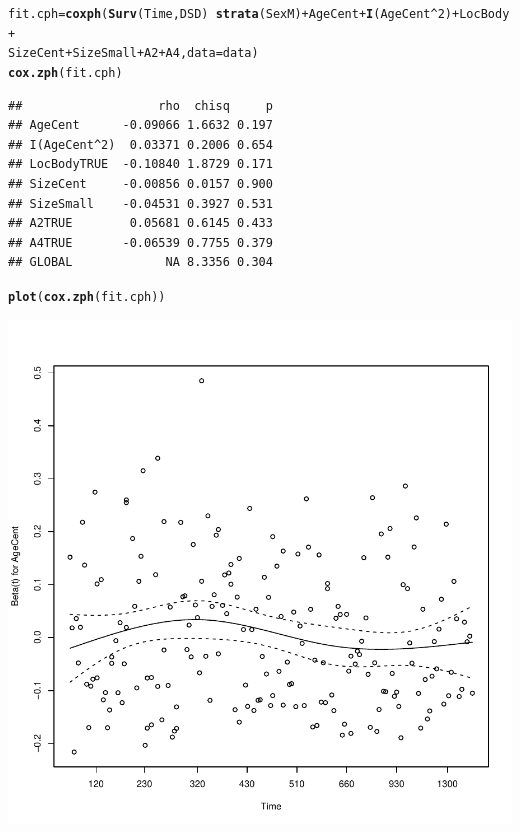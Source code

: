 \documentclass{article}\usepackage[]{graphicx}\usepackage[]{color}
\makeatletter
\def\maxwidth{ %
  \ifdim\Gin@nat@width>\linewidth
    \linewidth
  \else
    \Gin@nat@width
  \fi
}
\newcommand{\hlnum}[1]{\textcolor[rgb]{0.686,0.059,0.569}{#1}}%
\newcommand{\hlopt}[1]{\textcolor[rgb]{0,0,0}{#1}}%
\newcommand{\hlstd}[1]{\textcolor[rgb]{0.345,0.345,0.345}{#1}}%
\newcommand{\hlkwb}[1]{\textcolor[rgb]{0.69,0.353,0.396}{#1}}%
\newcommand{\hlkwc}[1]{\textcolor[rgb]{0.333,0.667,0.333}{#1}}%
\newcommand{\hlkwd}[1]{\textcolor[rgb]{0.737,0.353,0.396}{\textbf{#1}}}%
\newenvironment{kframe}{%
 \def\at@end@of@kframe{}%
 \ifinner\ifhmode%
  \def\at@end@of@kframe{\end{minipage}}%
  \begin{minipage}{\columnwidth}%
 \fi\fi%
 \def\FrameCommand##1{\hskip\@totalleftmargin \hskip-\fboxsep
 \colorbox{shadecolor}{##1}\hskip-\fboxsep
     \hskip-\linewidth \hskip-\@totalleftmargin \hskip\columnwidth}%
 \MakeFramed {\advance\hsize-\width
   \@totalleftmargin\z@ \linewidth\hsize
   \@setminipage}}%
 {\par\unskip\endMakeFramed%
 \at@end@of@kframe}
\newenvironment{knitrout}{}{} %
\makeatother
\begin{document}
\begin{knitrout}
\color{fgcolor}\begin{kframe}
\begin{alltt}
\hlstd{fit.cph} \hlkwb{=} \hlkwd{coxph}\hlstd{(}\hlkwd{Surv}\hlstd{(Time, DSD)} \hlopt{~} \hlkwd{strata}\hlstd{(SexM)} \hlopt{+} \hlstd{AgeCent} \hlopt{+} \hlkwd{I}\hlstd{(AgeCent}\hlopt{^}\hlnum{2}\hlstd{)} \hlopt{+} \hlstd{LocBody} \hlopt{+}
    \hlstd{SizeCent} \hlopt{+} \hlstd{SizeSmall} \hlopt{+} \hlstd{A2} \hlopt{+} \hlstd{A4,} \hlkwc{data} \hlstd{= data)}
\hlkwd{cox.zph}\hlstd{(fit.cph)}
\end{alltt}
\begin{verbatim}
##                   rho  chisq     p
## AgeCent      -0.09066 1.6632 0.197
## I(AgeCent^2)  0.03371 0.2006 0.654
## LocBodyTRUE  -0.10840 1.8729 0.171
## SizeCent     -0.00856 0.0157 0.900
## SizeSmall    -0.04531 0.3927 0.531
## A2TRUE        0.05681 0.6145 0.433
## A4TRUE       -0.06539 0.7755 0.379
## GLOBAL             NA 8.3356 0.304
\end{verbatim}
\begin{alltt}
\hlkwd{plot}\hlstd{(}\hlkwd{cox.zph}\hlstd{(fit.cph))}
\end{alltt}
\end{kframe}

{\centering \includegraphics[width=\maxwidth]{figure/eda-ph-check-full-3-1} 

}
\end{knitrout}
\end{document}
